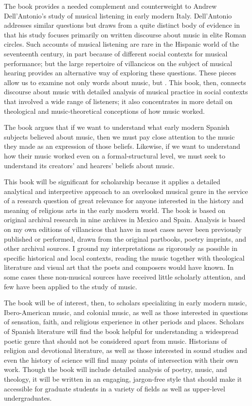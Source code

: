 \documentclass{vcbook-proposal}
\begin{document}
The book provides a needed complement and counterweight to Andrew
Dell'Antonio's study of musical listening in early modern Italy.%
    \Autocite{DellAntonio:Listening}
Dell'Antonio addresses similar questions but draws from a quite distinct body of
evidence in that his study focuses primarily on written discourse about music in
elite Roman circles.
Such accounts of musical listening are rare in the Hispanic world of the
seventeenth century, in part because of different social contexts for musical
performance; but the large repertoire of villancicos on the subject of musical
hearing provides an alternative way of exploring these questions.
These pieces allow us to examine not only words about music, but .
This book, then, connects discourse about music with detailed analysis of musical
practice in social contexts that involved a wide range of listeners; it also 
concentrates in more detail on theological and music-theoretical conceptions
of how music worked.

The book argues that if we want to understand what early modern Spanish 
subjects believed about music, then we must pay close attention to the music 
they made as an expression of those beliefs.
Likewise, if we want to understand how their music worked even on a 
formal-structural level, we must seek to understand its creators' and hearers' 
beliefs about music.

This book will be significant for scholarship because it applies a detailed
analytical and interpretive approach to an overlooked musical genre in the
service of a research question of great relevance for anyone interested in the
history and meaning of religious arts in the early modern world.
The book is based on original archival research in nine archives in Mexico and 
Spain.
Analysis is based on my own editions of villancicos that have in most cases 
never been previously published or performed, drawn from the original partbooks, 
poetry imprints, and other archival sources.
I ground my interpretations as rigorously as possible in specific historical 
and local contexts, reading the music together with theological literature and 
visual art that the poets and composers would have known.
In some cases these non-musical sources have received little scholarly 
attention, and few have been applied to the study of music.

The book will be of interest, then, to scholars specializing in early
modern music, Ibero-American music, and colonial music, as well as those
interested in questions of sensation, faith, and religious experience in other
periods and places.
Scholars of Spanish literature will find the book helpful for understanding a
widespread poetic genre that should not be considered apart from music.
Historians of religion and devotional literature, as well as those interested
in sound studies and even the history of science will find many points of
intersection with their own work.
Though the book will include detailed analysis of poetry, music, and theology,
it will be written in an engaging, jargon-free style that should make it
accessible for graduate students in a variety of fields as well as upper-level
undergraduates. 
\end{document}
